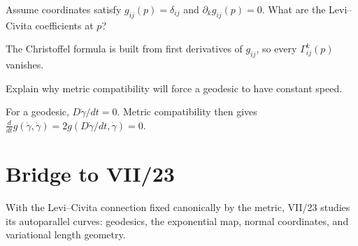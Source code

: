 \begin{problem}\label{prob:vii22-ch04}
Assume coordinates satisfy \(g_{ij}(p)=\delta_{ij}\) and \(\partial_k g_{ij}(p)=0\). What are the Levi--Civita coefficients at \(p\)?
\end{problem}
\begin{solution}
The Christoffel formula is built from first derivatives of \(g_{ij}\), so every \(\Gamma^k_{ij}(p)\) vanishes.
\end{solution}


\begin{problem}\label{prob:vii22-ch05}
Explain why metric compatibility will force a geodesic to have constant speed.
\end{problem}
\begin{solution}
For a geodesic, \(D\dot\gamma/dt=0\). Metric compatibility then gives \(\frac d{dt}g(\dot\gamma,\dot\gamma)=2g(D\dot\gamma/dt,\dot\gamma)=0\).
\end{solution}

\section*{Bridge to VII/23}
With the Levi--Civita connection fixed canonically by the metric, VII/23 studies its autoparallel curves: geodesics, the exponential map, normal coordinates, and variational length geometry.
